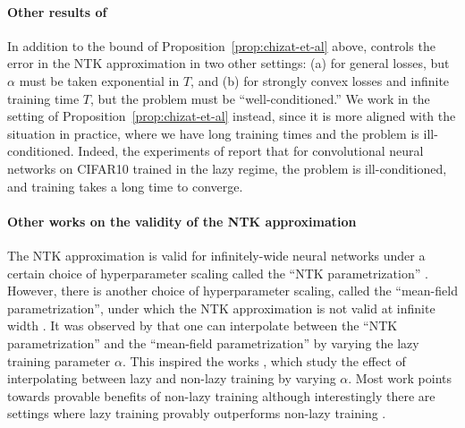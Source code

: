 \documentclass[11pt]{article} %
\newcommand{\<}{\langle}
\renewcommand{\>}{\rangle}
\theoremstyle{plain}
\theoremstyle{definition}
\theoremstyle{remark}
\begin{document}
\paragraph{Other results of \cite{chizat2019lazy}}


In addition to the bound of Proposition~\ref{prop:chizat-et-al} above, \cite{chizat2019lazy} controls the error in the NTK approximation in two other settings: (a) for general losses, but $\alpha$ must be taken exponential in $T$, and (b) for strongly convex losses and infinite training time $T$, but the problem must be ``well-conditioned.'' We work in the setting of Proposition~\ref{prop:chizat-et-al} instead, since it is more aligned with the situation in practice, where we have long training times and the problem is ill-conditioned. Indeed, the experiments of \cite{chizat2019lazy} report that for convolutional neural networks on CIFAR10 trained in the lazy regime, the problem is ill-conditioned, and training takes a long time to converge.

\paragraph{Other works on the validity of the NTK approximation} The NTK approximation is valid for infinitely-wide neural networks under a certain choice of hyperparameter scaling called the ``NTK parametrization'' \cite{jacot2018neural}. However, there is another choice of hyperparameter scaling, called the ``mean-field parametrization'', under which the NTK approximation is not valid at infinite width \citep{chizat2018global,rotskoff2018neural,sirignano2022mean,mei2018mean,mei2019mean,yang2021tensor}. It was observed by \cite{chizat2019lazy} that one can interpolate between the ``NTK parametrization'' and the ``mean-field parametrization'' by varying the lazy training parameter $\alpha$. This inspired the works 
\cite{woodworth2020kernel,geiger2020disentangling,geiger2021landscape}, which study the effect of interpolating between lazy and non-lazy training by varying $\alpha$. Most work points towards provable 
benefits of non-lazy training \citep{allen2019can,bai2019beyond,bai2020taylorized,chen2020towards,nichani2022identifying,ghorbani2020neural,malach2021quantifying,abbe2022merged,abbe2023sgd,mousavi2022neural,damian2022neural,bietti2022learning,ba2022high} although interestingly there are settings where lazy training provably outperforms non-lazy training
\citep{petrini2022learning}.
\end{document}
